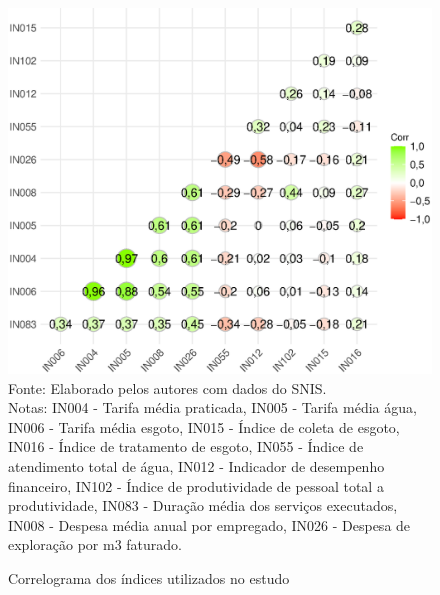 \begin{figure}[H]
        \centering
        	\begin{minipage}{0.55\textwidth}	
                \caption{Correlograma dos índices utilizados no estudo}
                \label{f:corr}
                \includegraphics[scale=0.5]{figures/cor.eps}                 
            	\footnotesize \\
            		Fonte: Elaborado pelos autores com dados do SNIS. \\
            		Notas: IN004 - Tarifa média praticada,
				IN005 - Tarifa média água,
				IN006 - Tarifa média esgoto,		
				IN015 - Índice de coleta de esgoto,
				IN016 - Índice de tratamento de esgoto,
				IN055 - Índice de atendimento total de água,	
				IN012 - Indicador de desempenho financeiro,
				IN102 - Índice de produtividade de pessoal total a produtividade,
				IN083 - Duração média dos serviços executados,	
				IN008 - Despesa média anual por empregado,
				IN026 - Despesa de exploração por m3 faturado.   	
	\end{minipage}
\end{figure}













